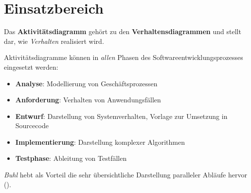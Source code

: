 \section{Einsatzbereich}

Das \textbf{Aktivitätsdiagramm} gehört zu den \textbf{Verhaltensdiagrammen} und stellt dar, wie \textit{Verhalten} realisiert wird.\\

\begin{tcolorbox}
Aktivitätsdiagramme können in \textit{allen} Phasen des Softwareentwicklungsprozesses eingesetzt werden:

\begin{itemize}
    \item \textbf{Analyse}: Modellierung von Geschäftsprozessen
    \item \textbf{Anforderung}: Verhalten von Anwendungsfällen
    \item \textbf{Entwurf}: Darstellung von Systemverhalten, Vorlage zur Umsetzung in Sourcecode
    \item \textbf{Implementierung}: Darstellung komplexer Algorithmen
    \item \textbf{Testphase}: Ableitung von Testfällen
\end{itemize}
\end{tcolorbox}

\noindent
\textit{Buhl} hebt als Vorteil die sehr übersichtliche Darstellung paralleler Abläufe hervor (\cite[57]{Buh09}).